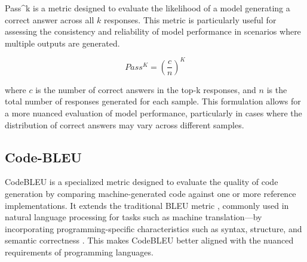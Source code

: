 Pass\textasciicircum k is a metric designed to evaluate the likelihood of a model generating a correct answer across all \(k\) responses. This metric is particularly useful for assessing the consistency and reliability of model performance in scenarios where multiple outputs are generated.

\begin{equation}
    Pass^{K} = (\frac{c}{n})^{K}
\end{equation}

where \(c\) is the number of correct answers in the top-k responses, and \(n\) is the total number of responses generated for each sample. This formulation allows for a more nuanced evaluation of model performance, particularly in cases where the distribution of correct answers may vary across different samples.




\subsection{Code-BLEU}

CodeBLEU is a specialized metric designed to evaluate the quality of code generation by comparing machine-generated code against one or more reference implementations. It extends the traditional BLEU metric \citep{Papineni2002BLEU}, commonly used in natural language processing for tasks such as machine translation—by incorporating programming-specific characteristics such as syntax, structure, and semantic correctness \citep{Ren2020CodeBLEU}. This makes CodeBLEU better aligned with the nuanced requirements of programming languages.

